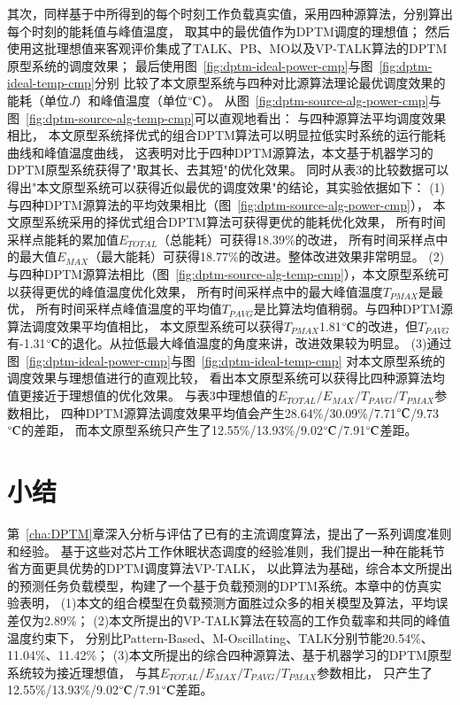 其次，同样基于中所得到的每个时刻工作负载真实值，采用四种源算法，分别算出每个时刻的能耗值与峰值温度， 取其中的最优值作为DPTM调度的理想值； 然后使用这批理想值来客观评价集成了TALK、PB、MO以及VP-TALK算法的DPTM原型系统的调度效果； 最后使用图~\ref{fig:dptm-ideal-power-cmp}与图~\ref{fig:dptm-ideal-temp-cmp}分别 比较了本文原型系统与四种对比源算法理论最优调度效果的能耗（单位$J$）和峰值温度（单位$\celsius$）。
从图~\ref{fig:dptm-source-alg-power-cmp}与图~\ref{fig:dptm-source-alg-temp-cmp}可以直观地看出： 与四种源算法平均调度效果相比， 本文原型系统择优式的组合DPTM算法可以明显拉低实时系统的运行能耗曲线和峰值温度曲线， 这表明对比于四种DPTM源算法，本文基于机器学习的DPTM原型系统获得了"取其长、去其短"的优化效果。 同时从表3的比较数据可以得出"本文原型系统可以获得近似最优的调度效果"的结论，其实验依据如下：
(1)与四种DPTM源算法的平均效果相比（图~\ref{fig:dptm-source-alg-power-cmp}）， 本文原型系统采用的择优式组合DPTM算法可获得更优的能耗优化效果， 所有时间采样点能耗的累加值$E_{TOTAL}$（总能耗）可获得18.39\%的改进， 所有时间采样点中的最大值$E_{MAX}$（最大能耗）可获得18.77\%的改进。整体改进效果非常明显。
(2)与四种DPTM源算法相比（图~\ref{fig:dptm-source-alg-temp-cmp}），本文原型系统可以获得更优的峰值温度优化效果， 所有时间采样点中的最大峰值温度$T_{PMAX}$是最优， 所有时间采样点峰值温度的平均值$T_{PAVG}$是比算法均值稍弱。与四种DPTM源算法调度效果平均值相比， 本文原型系统可以获得$T_{PMAX}$1.81$\celsius$的改进，但$T_{PAVG}$ 有-1.31$\celsius$的退化。从拉低最大峰值温度的角度来讲，改进效果较为明显。
(3)通过图~\ref{fig:dptm-ideal-power-cmp}与图~\ref{fig:dptm-ideal-temp-cmp} 对本文原型系统的调度效果与理想值进行的直观比较， 看出本文原型系统可以获得比四种源算法均值更接近于理想值的优化效果。 与表3中理想值的$E_{TOTAL}/E_{MAX}/T_{PAVG}/T_{PMAX}$参数相比， 四种DPTM源算法调度效果平均值会产生28.64\%/30.09\%/7.71$\celsius$/9.73$\celsius$的差距， 而本文原型系统只产生了12.55\%/13.93\%/9.02$\celsius$/7.91$\celsius$差距。

\section{小结}
第~\ref{cha:DPTM}章深入分析与评估了已有的主流调度算法，提出了一系列调度准则和经验。 基于这些对芯片工作休眠状态调度的经验准则，我们提出一种在能耗节省方面更具优势的DPTM调度算法VP-TALK， 以此算法为基础，综合本文所提出的预测任务负载模型，构建了一个基于负载预测的DPTM系统。本章中的仿真实验表明， (1)本文的组合模型在负载预测方面胜过众多的相关模型及算法，平均误差仅为2.89\%； (2)本文所提出的VP-TALK算法在较高的工作负载率和共同的峰值温度约束下， 分别比Pattern-Based、M-Oscillating、TALK分别节能20.54\%、11.04\%、11.42\%； (3)本文所提出的综合四种源算法、基于机器学习的DPTM原型系统较为接近理想值， 与其$E_{TOTAL}/E_{MAX}/T_{PAVG}/T_{PMAX}$参数相比， 只产生了12.55\%/13.93\%/9.02$\celsius$/7.91$\celsius$差距。